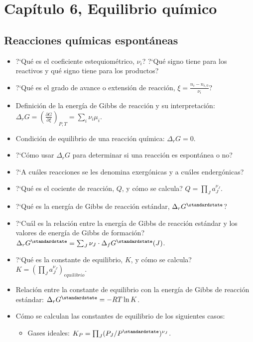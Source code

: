 \documentclass[a4paper,12pt]{article}
\begin{document}
\section*{Cap\'itulo 6, Equilibrio qu\'imico}

\subsection*{Reacciones qu\'imicas espont\'aneas}

\begin{itemize}
 \item ?`Qu\'e es el coeficiente estequiom\'etrico, $\nu_i$? ?`Qu\'e signo tiene para los reactivos y qu\'e signo tiene para los productos?
 \item ?`Qu\'e es el grado de avance o extensi\'on de reacci\'on, $\xi=\frac{n_i-n_{i,0}}{\nu_i}$?
 \item Definici\'on de la energ\'ia de Gibbs de reacci\'on y su interpretaci\'on: $\Delta_rG=\left(\frac{\partial G}{\partial\xi}\right)_{P,T}=\sum_i\nu_i\mu_i$.
 \item Condici\'on de equilibrio de una reacci\'on qu\'imica: $\Delta_rG=0$.
 \item ?`C\'omo usar $\Delta_rG$ para determinar si una reacci\'on es espont\'anea o no?
 \item ?`A cu\'ales reacciones se les denomina exerg\'onicas y a cu\'ales enderg\'onicas?
 \item ?`Qu\'e es el cociente de reacci\'on, $Q$, y c\'omo se calcula? $Q=\prod_J a_J^{\nu_J}$.
 \item ?`Qu\'e es la energ\'ia de Gibbs de reacci\'on est\'andar, $\Delta_rG^\standardstate$?
 \item ?`Cu\'al es la relaci\'on entre la energ\'ia de Gibbs de reacci\'on est\'andar y los valores de energ\'ia de Gibbs de formaci\'on? $\Delta_rG^\standardstate=\sum_J\nu_J\cdot\Delta_fG^\standardstate(J)$.
 \item ?`Qu\'e es la constante de equilibrio, $K$, y c\'omo se calcula? $K=\left(\prod_J a_J^{\nu_J}\right)_{equilibrio}$.
 \item Relaci\'on entre la constante de equilibrio con la energ\'ia de Gibbs de reacci\'on est\'andar: $\Delta_rG^\standardstate=-RT\ln K$.
 \item C\'omo se calculan las constantes de equilibrio de los siguientes casos:
 \begin{itemize}
  \item Gases ideales: $K_P=\prod_J (P_J/P^\standardstate)^{\nu_J}$.

\end{itemize}
\end{itemize}
\end{document}

